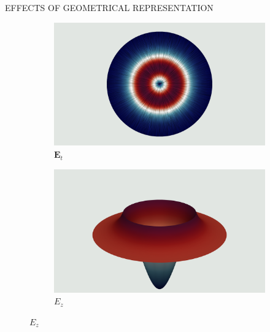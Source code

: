 \documentclass[debug]{beamer} %
\begin{document}
\begin{frame}
\begin{columns}
\begin{column}{0.45\textwidth}
{\begin{block}{\boxnumber EFFECTS OF GEOMETRICAL REPRESENTATION}
	        \begin{figure}[hb]
	        	\begin{mdframed}[backgroundcolor=bggrey]
					\centering
					\begin{subfigure}[b]{.4999\textwidth}
						\centering
						\caption*{$\displaystyle\bm{E}_t$}
						\includegraphics[width=1\linewidth]{images/et2posterStepFiber.png}%
					\end{subfigure}\hfill
					\begin{subfigure}[b]{.4999\textwidth}
						\centering
						\caption*{$\displaystyle E_z$}
						\includegraphics[width=1\linewidth]{images/ez2posterStepFiber.png}%
					\end{subfigure}


\end{mdframed}
\end{figure}
\end{block}}
\end{column}
\end{columns}
\end{frame}
\end{document}
